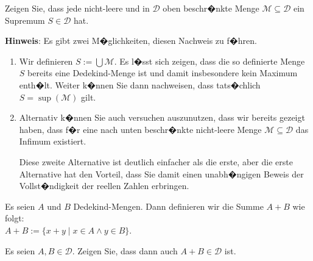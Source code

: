 \exercise
Zeigen Sie, dass jede nicht-leere und in $\mathcal{D}$ oben beschr�nkte Menge
$\mathcal{M} \subseteq \mathcal{D}$ ein Supremum $S \in \mathcal{D}$ hat.
\vspace*{0.2cm}

\noindent
\textbf{Hinweis}:  Es gibt zwei M�glichkeiten, diesen Nachweis zu f�hren.
\begin{enumerate}
\item Wir definieren $S := \bigcup \mathcal{M}$.  Es l�sst sich zeigen, dass die so definierte Menge
      $S$ bereits eine Dedekind-Menge ist und damit insbesondere kein Maximum enth�lt.  
      Weiter k�nnen Sie dann nachweisen, dass tats�chlich $S = \sup(\mathcal{M})$ gilt.  
\item Alternativ k�nnen Sie auch versuchen auszunutzen, dass wir bereits gezeigt haben, dass f�r
      eine nach unten beschr�nkte nicht-leere Menge $\mathcal{M} \subseteq \mathcal{D}$
      das Infimum existiert.

      Diese zweite Alternative ist deutlich einfacher als die erste, aber die erste Alternative hat den
      Vorteil, dass Sie damit einen unabh�ngigen Beweis der Vollst�ndigkeit der reellen Zahlen erbringen.
      \eox 
\end{enumerate}

\begin{Definition}
Es seien $A$ und $B$ Dedekind-Mengen.  Dann definieren wir die Summe $A + B$ wie folgt:
\\[0.2cm]
\hspace*{1.3cm}
$A + B := \{ x + y \mid x \in A \wedge y \in B \}$. \eod
\end{Definition}

\exercise
Es seien $A,B \in \mathcal{D}$.  Zeigen Sie, dass dann auch $A + B \in \mathcal{D}$ ist.
\eox

